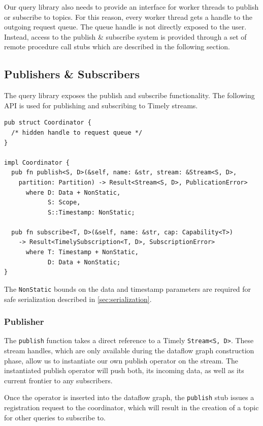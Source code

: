 Our query library also needs to provide an interface for worker threads to
publish or subscribe to topics. For this reason, every worker thread gets
a handle to the outgoing request queue. The queue handle is not directly exposed
to the user. Instead, access to the publish \& subscribe system is provided
through a set of remote procedure call stubs which are described in the
following section.

\subsection{Publishers \& Subscribers}

The query library exposes the publish and subscribe functionality. The following
API is used for publishing and subscribing to Timely streams.

\begin{lstlisting}[caption={[Publish \& subscribe interface]
The interface for publishing and subscribing Timely streams.
}]
pub struct Coordinator {
  /* hidden handle to request queue */
}

impl Coordinator {
  pub fn publish<S, D>(&self, name: &str, stream: &Stream<S, D>,
    partition: Partition) -> Result<Stream<S, D>, PublicationError>
      where D: Data + NonStatic, 
            S: Scope,
            S::Timestamp: NonStatic;

  pub fn subscribe<T, D>(&self, name: &str, cap: Capability<T>) 
    -> Result<TimelySubscription<T, D>, SubscriptionError>
      where T: Timestamp + NonStatic, 
            D: Data + NonStatic;
}
\end{lstlisting}

The \lstinline{NonStatic} bounds on the data and timestamp
parameters are required for safe serialization described in \ref{sec:serialization}.

\subsubsection{Publisher}

The \lstinline{publish} function takes a direct reference to a Timely
\lstinline{Stream<S, D>}. These stream handles, which are only available during
the dataflow graph construction phase, allow us to instantiate our own publish
operator on the stream.  The instantiated publish operator will push both, its
incoming data, as well as its current frontier to any subscribers. 

Once the operator is inserted into the dataflow graph, the \lstinline{publish}
stub issues a registration request to the coordinator, which will result in the
creation of a topic for other queries to subscribe to.

